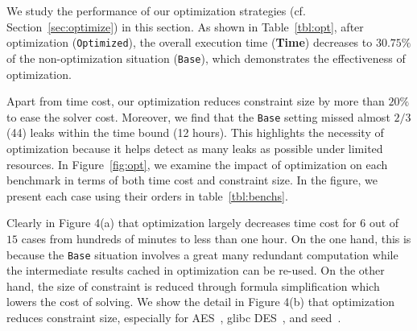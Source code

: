 \documentclass[sigconf]{acmart}
\begin{document}
\begin{table}%
\caption{Overall performance Increases from Optimization. }
\label{tbl:opt}
\centering
{}
\end{table}




We study the performance of our optimization strategies (cf. Section~\ref{sec:optimize})
in this section. As shown in Table~\ref{tbl:opt}, after optimization (\texttt{Optimized}), 
the overall execution time (\textbf{Time}) decreases to $30.75\%$ of the non-optimization 
situation (\texttt{Base}), which demonstrates the effectiveness of optimization. 

Apart from time cost, our optimization reduces constraint size by more than $20\%$ to 
ease the solver cost. Moreover, we find that the \texttt{Base} setting missed almost 
$2/3$ (44) leaks within the time bound (12 hours). This highlights the necessity of 
optimization because it helps detect as many leaks as possible under limited resources. 
In Figure~\ref{fig:opt}, we examine the impact of optimization on each benchmark in 
terms of both time cost and constraint size. In the figure, we present each case using 
their orders in table~\ref{tbl:benchs}. 

Clearly in Figure 4(a) that optimization 
largely decreases time cost for $6$ out of $15$ cases from hundreds of minutes to less
than one hour. On the one hand, this is because the \texttt{Base} situation involves
a great many redundant computation while the intermediate results cached in optimization 
can be re-used. On the other hand, the size of constraint is reduced through formula 
simplification which lowers the cost of solving. We show the detail in Figure 4(b)
that optimization reduces constraint size, especially for AES~\cite{LibTomCrypt}, glibc DES~\cite{glibc}, and seed~\cite{Tegra}. 
\end{document}

